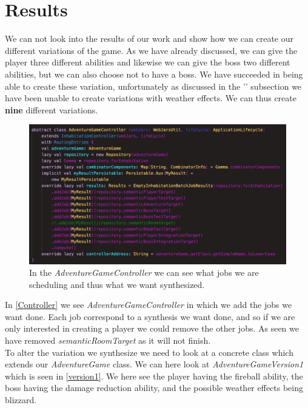 \section{Results}
We can not look into the results of our work and show how we can create our different variations of the game. As we have already discussed, we can give the player three different abilities and likewise we can give the boss two different abilities, but we can also choose not to have a boss. We have succeeded in being able to create these variation, unfortunately as discussed in the '' subsection we have been unable to create variations with weather effects. We can thus create \textbf{nine} different variations.

\begin{figure}[H]
	\centering
	\includegraphics[width=\linewidth]{Materials/Results/AdventureController}
	\caption{In the \textit{AdventureGameController} we can see what jobs we are scheduling and thus what we want synthesized.}
	\label{Controller}
\end{figure}
In \autoref{Controller} we see \textit{AdventureGameController} in which we add the jobs we want done. Each job correspond to a synthesis we want done, and so if we are only interested in creating a player we could remove the other jobs. As seen we have removed \textit{semanticRoomTarget} as it will not finish.\\
To alter the variation we synthesize we need to look at a concrete class which extends our \textit{AdventureGame} class. We can here look at \textit{AdventureGameVersion1} which is seen in \autoref{version1}. We here see the player having the fireball ability, the boss having the damage reduction ability, and the possible weather effects being blizzard.\\

